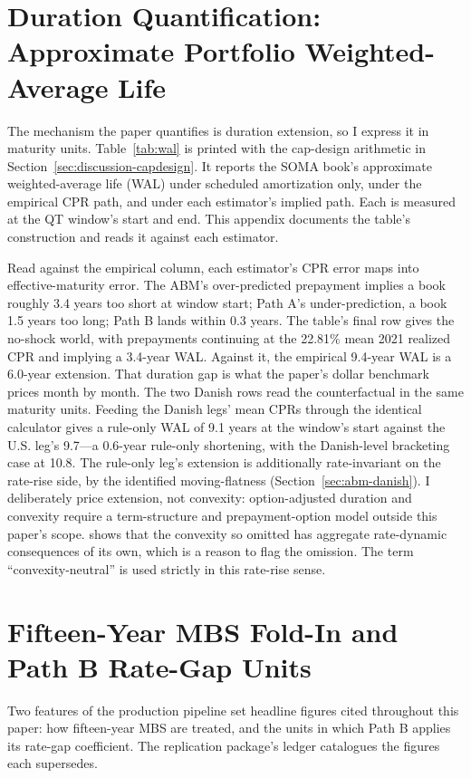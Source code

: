 \documentclass[12pt]{article}
\begin{document}
\section{Duration Quantification: Approximate Portfolio Weighted-Average Life}\label{sec:robustness-wal}

The mechanism the paper quantifies is duration extension, so I express it in maturity units. Table~\ref{tab:wal} is printed with the cap-design arithmetic in Section~\ref{sec:discussion-capdesign}. It reports the SOMA book's approximate weighted-average life (WAL) under scheduled amortization only, under the empirical CPR path, and under each estimator's implied path. Each is measured at the QT window's start and end. This appendix documents the table's construction and reads it against each estimator.

Read against the empirical column, each estimator's CPR error maps into effective-maturity error. The ABM's over-predicted prepayment implies a book roughly 3.4 years too short at window start; Path A's under-prediction, a book 1.5 years too long; Path B lands within 0.3 years. The table's final row gives the no-shock world, with prepayments continuing at the 22.81\% mean 2021 realized CPR and implying a 3.4-year WAL. Against it, the empirical 9.4-year WAL is a 6.0-year extension. That duration gap is what the paper's dollar benchmark prices month by month. The two Danish rows read the counterfactual in the same maturity units. Feeding the Danish legs' mean CPRs through the identical calculator gives a rule-only WAL of 9.1 years at the window's start against the U.S. leg's 9.7---a 0.6-year rule-only shortening, with the Danish-level bracketing case at 10.8. The rule-only leg's extension is additionally rate-invariant on the rate-rise side, by the identified moving-flatness (Section~\ref{sec:abm-danish}). I deliberately price extension, not convexity: option-adjusted duration and convexity require a term-structure and prepayment-option model outside this paper's scope. \citet{hanson2014} shows that the convexity so omitted has aggregate rate-dynamic consequences of its own, which is a reason to flag the omission. The term ``convexity-neutral'' is used strictly in this rate-rise sense.

\section{Fifteen-Year MBS Fold-In and Path B Rate-Gap Units}\label{sec:robustness-pipeline}

Two features of the production pipeline set headline figures cited throughout this paper: how fifteen-year MBS are treated, and the units in which Path B applies its rate-gap coefficient. The replication package's ledger catalogues the figures each supersedes.
\end{document}
